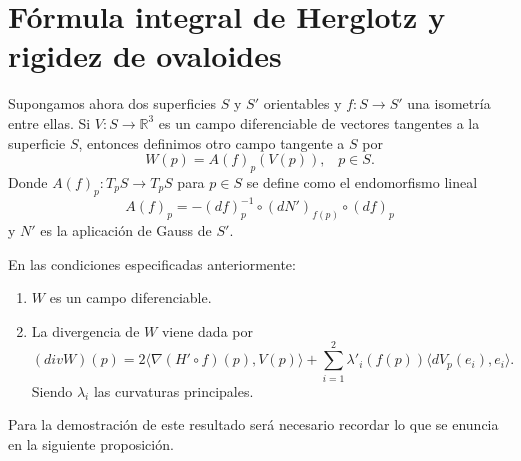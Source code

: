 	${ }$\\
\section{Fórmula integral de Herglotz y rigidez de ovaloides}
	${ }$\\
	
Supongamos ahora dos superficies $S$ y $S'$ orientables  y $f : S \to S'$ una isometría entre ellas. Si $V : S \to \mathbb{R}^3$ es un campo diferenciable de vectores tangentes a la superficie $S$, entonces definimos otro campo tangente a $S$ por
${ }$\\
\[
	W(p) = A(f)_p(V(p)), \;\;\; p \in S.
\]
${ }$\\
Donde $A(f)_p : T_p S \to T_p S$ para $p \in S$ se define como el endomorfismo lineal
${ }$\\
\[
	A(f)_p = -(df)^{-1}_{p} \circ (dN')_{f(p)} \circ (df)_p
\]
${ }$\\
y $N'$ es la aplicación de Gauss de $S'$.
${ }$\\

\begin{lema} \label{lem:lema1}
	En las condiciones especificadas anteriormente:
	\begin{enumerate}
		\item $W$ es un campo diferenciable.
		\item La divergencia de $W$ viene dada por 
		\[
			(div W)(p) = 2 \langle \nabla (H' \circ f)(p), V(p) \rangle + \sum_{i=1}^{2} \lambda'_{i}(f(p)) \langle dV_p(e_i), e_i \rangle.
		\]
		Siendo $\lambda_i$ las curvaturas principales.
	\end{enumerate}
	
\end{lema}


	${ }$\\
	
	Para la demostración de este resultado será necesario recordar lo que se enuncia en la siguiente proposición.
	${ }$\\
	
